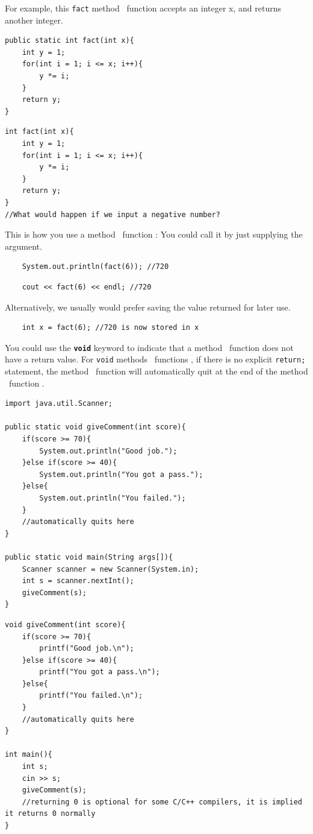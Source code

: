 For example, this \texttt{fact}\if{} method \else ~function \fi accepts an integer x, and returns another integer.
\if{}
\begin{lstlisting}
public static int fact(int x){
    int y = 1;
    for(int i = 1; i <= x; i++){
        y *= i;
    }
    return y;
}
\end{lstlisting}
\else
\begin{lstlisting}
int fact(int x){
    int y = 1;
    for(int i = 1; i <= x; i++){
        y *= i;
    }
    return y;
}
//What would happen if we input a negative number?
\end{lstlisting}
\fi

This is how you use a\if{} method \else ~function \fi: 
You could call it by just supplying the argument.

\if{}
\begin{lstlisting}
    System.out.println(fact(6)); //720
\end{lstlisting}
\else
\begin{lstlisting}
    cout << fact(6) << endl; //720
\end{lstlisting}
\fi

Alternatively, we usually would prefer saving the value returned for later use.

\begin{lstlisting}
    int x = fact(6); //720 is now stored in x
\end{lstlisting}

You could use the \texttt{\textbf{void}} keyword to indicate that a\if{} method \else ~function \fi does not have a return value. For \texttt{void}\if{} methods \else ~functions \fi, if there is no explicit \texttt{return;} statement, the\if{} method \else ~function \fi will automatically quit at the end of the\if{} method \else ~function \fi. 

\if{}
\begin{lstlisting}
import java.util.Scanner;

public static void giveComment(int score){
    if(score >= 70){
        System.out.println("Good job.");
    }else if(score >= 40){
        System.out.println("You got a pass.");
    }else{
        System.out.println("You failed.");
    }
    //automatically quits here
}

public static void main(String args[]){
    Scanner scanner = new Scanner(System.in);  
    int s = scanner.nextInt();
    giveComment(s);
}
\end{lstlisting}
\else
\begin{lstlisting}
void giveComment(int score){
    if(score >= 70){
        printf("Good job.\n");
    }else if(score >= 40){
        printf("You got a pass.\n");
    }else{
        printf("You failed.\n");
    }
    //automatically quits here
}

int main(){
    int s;
    cin >> s;
    giveComment(s);
    //returning 0 is optional for some C/C++ compilers, it is implied it returns 0 normally
}
\end{lstlisting}
\fi

